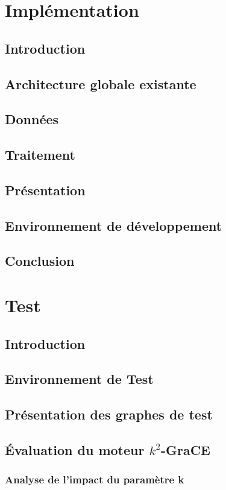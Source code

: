 \documentclass[a4paper,oneside,12pt]{report}
\theoremstyle{definition}
\begin{document}
	
	
	
	
\chapter{Implémentation}
	\section{Introduction}
	\section{Architecture globale existante}
	\section{Données}
	\section{Traitement}
	\section{Présentation}
	\section{Environnement de développement}
	\section{Conclusion}

\chapter{Test}
	\section{Introduction}
	\section{Environnement de Test}
	\section{Présentation des graphes de test}
	\section{Évaluation du moteur $k^2$-GraCE}
			\subsection{Analyse de l'impact du paramètre k}
\end{document}
